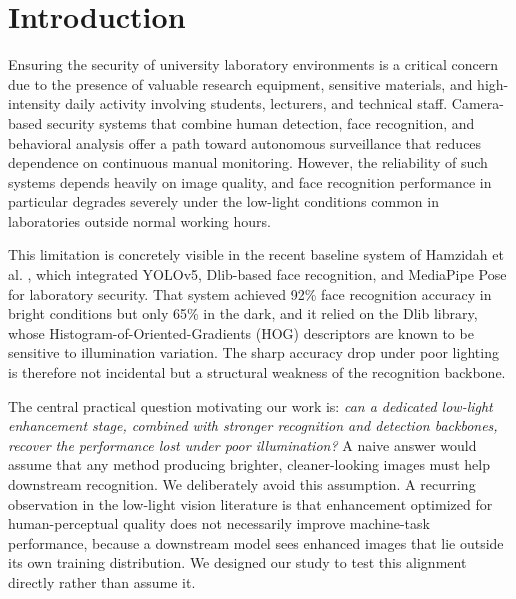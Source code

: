 \documentclass[conference]{IEEEtran}
\begin{document}
\section{Introduction}
Ensuring the security of university laboratory environments is
a critical concern due to the presence of valuable research
equipment, sensitive materials, and high-intensity daily
activity involving students, lecturers, and technical staff.
Camera-based security systems that combine human detection,
face recognition, and behavioral analysis offer a path toward
autonomous surveillance that reduces dependence on continuous
manual monitoring. However, the reliability of such systems
depends heavily on image quality, and face recognition
performance in particular degrades severely under the low-light
conditions common in laboratories outside normal working hours.

This limitation is concretely visible in the recent baseline
system of Hamzidah et al. \cite{hamzidah2026}, which integrated
YOLOv5, Dlib-based face recognition, and MediaPipe Pose for
laboratory security. That system achieved 92\% face recognition
accuracy in bright conditions but only 65\% in the dark, and it
relied on the Dlib library, whose Histogram-of-Oriented-Gradients
(HOG) descriptors are known to be sensitive to illumination
variation. The sharp accuracy drop under poor lighting is
therefore not incidental but a structural weakness of the
recognition backbone.

The central practical question motivating our work is:
\textit{can a dedicated low-light enhancement stage, combined
with stronger recognition and detection backbones, recover the
performance lost under poor illumination?} A naive answer would
assume that any method producing brighter, cleaner-looking
images must help downstream recognition. We deliberately avoid
this assumption. A recurring observation in the low-light vision
literature is that enhancement optimized for human-perceptual
quality does not necessarily improve machine-task performance,
because a downstream model sees enhanced images that lie outside
its own training distribution. We designed our study to test
this alignment directly rather than assume it.
\end{document}
